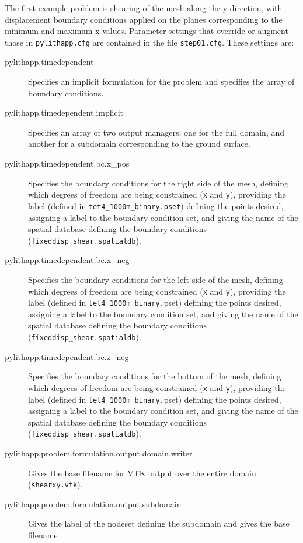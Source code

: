 The first example problem is shearing of the mesh along the y-direction,
with displacement boundary conditions applied on the planes corresponding
to the minimum and maximum x-values. Parameter settings that override
or augment those in \texttt{pylithapp.cfg} are contained in the file
\texttt{step01.cfg}. These settings are:
\begin{description}
\item [{pylithapp.timedependent}] Specifies an implicit formulation for
the problem and specifies the array of boundary conditions.
\item [{pylithapp.timedependent.implicit}] Specifies an array of two output
managers, one for the full domain, and another for a subdomain corresponding
to the ground surface.
\item [{pylithapp.timedependent.bc.x\_pos}] Specifies the boundary conditions
for the right side of the mesh, defining which degrees of freedom
are being constrained (\texttt{x} and \texttt{y}), providing the label
(defined in \texttt{tet4\_1000m\_binary.pset}) defining the points
desired, assigning a label to the boundary condition set, and giving
the name of the spatial database defining the boundary conditions
(\texttt{fixeddisp\_shear.spatialdb}).
\item [{pylithapp.timedependent.bc.x\_neg}] Specifies the boundary conditions
for the left side of the mesh, defining which degrees of freedom are
being constrained (\texttt{x} and \texttt{y}), providing the label
(defined in \texttt{tet4\_1000m\_binary.}pset) defining the points
desired, assigning a label to the boundary condition set, and giving
the name of the spatial database defining the boundary conditions
(\texttt{fixeddisp\_shear.spatialdb}).
\item [{pylithapp.timedependent.bc.z\_neg}] Specifies the boundary conditions
for the bottom of the mesh, defining which degrees of freedom are
being constrained (\texttt{x} and \texttt{y}), providing the label
(defined in \texttt{tet4\_1000m\_binary.}pset) defining the points
desired, assigning a label to the boundary condition set, and giving
the name of the spatial database defining the boundary conditions
(\texttt{fixeddisp\_shear.spatialdb}).
\item [{pylithapp.problem.formulation.output.domain.writer}] Gives the
base filename for VTK output over the entire domain (\texttt{shearxy.vtk}).
\item [{pylithapp.problem.formulation.output.subdomain}] Gives the label
of the nodeset defining the subdomain and gives the base filename

\end{description}
